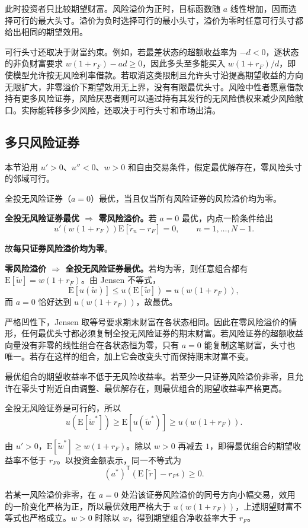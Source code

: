 此时投资者只比较期望财富。风险溢价为正时，目标函数随 $a$ 线性增加，因而选择可行的最大头寸。溢价为负时选择可行的最小头寸，溢价为零时任意可行头寸都给出相同的期望效用。

可行头寸还取决于财富约束。例如，若最差状态的超额收益率为 $-d<0$，逐状态的非负财富要求 $w(1+r_F)-ad\ge0$，因此多头至多能买入 $w(1+r_F)/d$，即使模型允许按无风险利率借款。若取消这类限制且允许头寸沿提高期望收益的方向无限扩大，非零溢价下期望效用无上界，没有有限最优头寸。风险中性者愿意借款持有更多风险证券，风险厌恶者则可以通过持有其发行的无风险债权来减少风险敞口。实际能转移多少风险，还取决于可行头寸和市场出清。

\subsection{多只风险证券}\label{sec:wj-eight-multiple}
本节沿用 $u'>0$、$u''<0$、$w>0$ 和自由交易条件，假定最优解存在，零风险头寸的邻域可行。
\begin{tcolorbox}[knowledge]
 全投无风险证券（$a=0$）最优，当且仅当所有风险证券的风险溢价均为零。
\end{tcolorbox}
\begin{solution}[label-content={证明},blank-type=none]
\textbf{全投无风险证券最优 $\Rightarrow$ 零风险溢价。}若 $a=0$ 最优，内点一阶条件给出
\[
 u'(w(1+r_F))\mathrm E[\tilde r_n-r_F]=0,
 \qquad n=1,\ldots,N-1.
\]

故\textbf{每只证券风险溢价均为零}。

\textbf{零风险溢价 $\Rightarrow$ 全投无风险证券最优。}若均为零，则任意组合都有 $\mathrm E[\tilde w]=w(1+r_F)$。由 Jensen 不等式，
\[
 \mathrm E[u(\tilde w)]\le u(\mathrm E[\tilde w])=u(w(1+r_F)),
\]
而 $a=0$ 恰好达到 $u(w(1+r_F))$，故最优。
\end{solution}

严格凹性下，Jensen 取等号要求期末财富在各状态相同。因此在零风险溢价的情形，任何最优头寸都必须复制全投无风险证券的期末财富。若风险证券的超额收益向量没有非零的线性组合在各状态恒为零，只有 $a=0$ 能复制这笔财富，头寸也唯一。若存在这样的组合，加上它会改变头寸而保持期末财富不变。

\begin{tcolorbox}[knowledge]
 最优组合的期望收益率不低于无风险收益率。若至少一只证券风险溢价非零，且允许在零头寸附近自由调整、最优解存在，则最优组合的期望收益率严格更高。
\end{tcolorbox}
\begin{solution}[label-content={证明},blank-type=none]
全投无风险证券是可行的，所以
\[
 u(\mathrm E[\tilde w^*])\ge\mathrm E[u(\tilde w^*)]\ge u(w(1+r_F)).
\]

由 $u'>0$，$\mathrm E[\tilde w^*]\ge w(1+r_F)$。除以 $w>0$ 再减去 $1$，即得最优组合的期望收益率不低于 $r_F$。以投资金额表示，同一不等式为
\[
 (a^*)^{\mathsf T}(\mathrm E[\tilde r]-r_F\iota)\ge0.
\]

若某一风险溢价非零，在 $a=0$ 处沿该证券风险溢价的同号方向小幅交易，效用的一阶变化严格为正，所以最优效用严格大于 $u(w(1+r_F))$，上述期望财富不等式也严格成立。$w>0$ 时除以 $w$，得到期望组合净收益率大于 $r_F$。
\end{solution}

